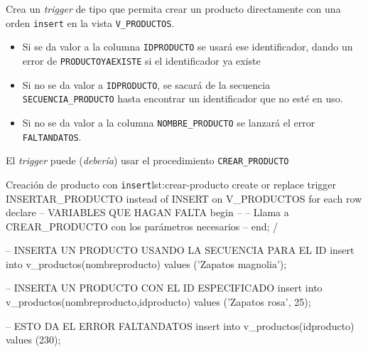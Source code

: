 \begin{homeworkProblem}

  Crea un \textit{trigger} de tipo  que permita crear un producto directamente con una orden \texttt{insert} en la vista \texttt{V\_PRODUCTOS}.
  \begin{itemize}
  \item Si se da valor a la columna \texttt{IDPRODUCTO} se usará ese identificador, dando un error de \texttt{PRODUCTOYAEXISTE} si el identificador ya existe
  \item Si no se da valor a \texttt{IDPRODUCTO}, se sacará de la secuencia \texttt{SECUENCIA\_PRODUCTO} hasta encontrar un identificador que no esté en uso.
  \item Si no se da valor a la columna \texttt{NOMBRE\_PRODUCTO} se lanzará el error \texttt{FALTANDATOS}.
  \end{itemize}

  \begin{Aviso}
    El \textit{trigger} puede (\textit{debería}) usar el procedimiento \texttt{CREAR\_PRODUCTO}
  \end{Aviso}
  
  
\begin{listadosql}{Creación de producto con \texttt{insert}}{lst:crear-producto}
create or replace trigger INSERTAR_PRODUCTO
instead of INSERT on V_PRODUCTOS
for each row
declare
  -- VARIABLES QUE HAGAN FALTA
begin
  -- 
  -- Llama a CREAR_PRODUCTO con los parámetros necesarios
  -- 
end;
/


-- INSERTA UN PRODUCTO USANDO LA SECUENCIA PARA EL ID
insert into v_productos(nombreproducto) values ('Zapatos magnolia');

-- INSERTA UN PRODUCTO CON EL ID ESPECIFICADO
insert into v_productos(nombreproducto,idproducto) values ('Zapatos rosa', 25);

-- ESTO DA EL ERROR FALTANDATOS
insert into v_productos(idproducto) values (230);


\end{listadosql}

\end{homeworkProblem}




